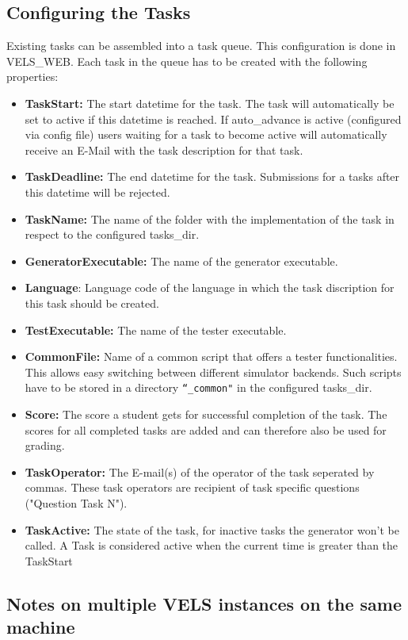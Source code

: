 \subsection{Configuring the Tasks} \label{sub:configTasks}
Existing tasks can be assembled into a task queue. This configuration is done in VELS\_WEB.
Each task in the queue has to be created with the following properties:
\begin{itemize}
\item {\bf TaskStart:} The start datetime for the task. The task will automatically
    be set to active if this datetime is reached. If auto\_advance is active (configured 
    via config file) users waiting for a task to become active will automatically 
    receive an E-Mail with the task description for that task.
\item {\bf TaskDeadline:} The end datetime for the task. Submissions for a tasks after
    this datetime will be rejected.
\item {\bf TaskName:} The name of the folder with the implementation of the task in respect
	to the configured tasks\_dir.
\item {\bf GeneratorExecutable:} The name of the generator executable.
\item {\bf Language}: Language code of the language in which the task discription for
	this task should be created.
\item {\bf TestExecutable:} The name of the tester executable.
\item {\bf CommonFile:} Name of a common script that offers a tester functionalities. This allows easy 
	switching between different simulator backends.	Such scripts have to be stored in a directory 
	{\tt ``\_common"} in the configured
	tasks\_dir.
\item {\bf Score:} The score a student gets for successful completion of the task. The
    scores for all completed tasks are added and can therefore also be used for grading.
\item {\bf TaskOperator:} The E-mail(s) of the operator of the task seperated by commas. 
	These task operators are recipient of task specific questions ("Question Task N").
\item {\bf TaskActive:} The state of the task, for inactive tasks the generator won't
    be called. A Task is considered active when the current time is greater than the 
    TaskStart
\end{itemize}

\subsection{Notes on multiple VELS instances on the same machine}

